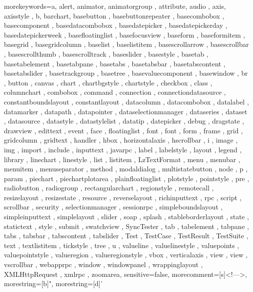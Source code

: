  {morekeywords={a, alert, animator, animatorgroup , attribute, audio , axis, axisstyle , b, barchart, basebutton , basebuttonrepeater , basecombobox , basecomponent , basedatacombobox , basedatepicker , basedatepickerday , basedatepickerweek , basefloatinglist , basefocusview , baseform , baseformitem , basegrid , basegridcolumn , baselist , baselistitem , basescrollarrow , basescrollbar , basescrollthumb , basescrolltrack , baseslider , basestyle , basetab , basetabelement , basetabpane , basetabs , basetabsbar , basetabscontent , basetabslider , basetrackgroup , basetree , basevaluecomponent , basewindow , br , button , canvas , chart , chartbgstyle , chartstyle , checkbox , class , columnchart , combobox , command , connection , connectiondatasource , constantboundslayout , constantlayout , datacolumn , datacombobox , datalabel , datamarker , datapath , datapointer , dataselectionmanager , dataseries , dataset , datasource , datastyle , datastylelist , datatip , datepicker , debug , dragstate , drawview , edittext , event , face , floatinglist , font , font , form , frame , grid , gridcolumn , gridtext , handler , hbox , horizontalaxis , hscrollbar , i , image , img , import , include , inputtext , javarpc , label , labelstyle , layout , legend , library , linechart , linestyle , list , listitem , LzTextFormat , menu , menubar , menuitem , menuseparator , method , modaldialog , multistatebutton , node , p , param , piechart , piechartplotarea , plainfloatinglist , plotstyle , pointstyle , pre , radiobutton , radiogroup , rectangularchart , regionstyle , remotecall , resizelayout , resizestate , resource , reverselayout , richinputtext , rpc , script , scrollbar , security , selectionmanager , sessionrpc , simpleboundslayout , simpleinputtext , simplelayout , slider , soap , splash , stableborderlayout , state , statictext , style , submit , swatchview , SyncTester , tab , tabelement , tabpane , tabs , tabsbar , tabscontent , tabslider , Test , TestCase , TestResult , TestSuite , text , textlistitem , tickstyle , tree , u , valueline , valuelinestyle , valuepoints , valuepointstyle , valueregion , valueregionstyle , vbox , verticalaxis , view , view , vscrollbar , webapprpc , window , windowpanel , wrappinglayout , XMLHttpRequest , xmlrpc , zoomarea},
sensitive=false, morecomment=[s]{<!--}{-->}, morestring=[b]", morestring=[d]'}



